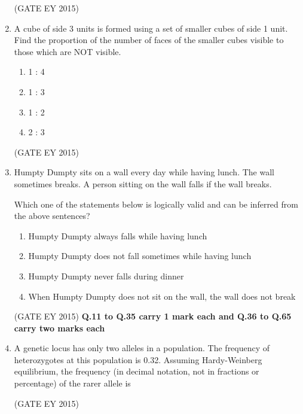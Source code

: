 \documentclass[journal,12pt,onecolumn]{IEEEtran}
\theoremstyle{remark}
\begin{document}
\begin{enumerate}
    
\hfill{(GATE EY 2015)}

\item A cube of side 3 units is formed using a set of smaller cubes of side 1 unit.
Find the proportion of the number of faces of the smaller cubes visible to those which are NOT visible.


\begin{multicols}{4}
\begin{enumerate}
    
\item 1 : 4
\item 1 : 3
\item 1 : 2
\item 2 : 3

    \end{enumerate}
    \end{multicols}
\hfill{(GATE EY 2015)}


\item Humpty Dumpty sits on a wall every day while having lunch. The wall sometimes breaks.
A person sitting on the wall falls if the wall breaks.

Which one of the statements below is logically valid and can be inferred from the above sentences?



\begin{enumerate}
    
\item Humpty Dumpty always falls while having lunch
\item Humpty Dumpty does not fall sometimes while having lunch
\item Humpty Dumpty never falls during dinner
\item When Humpty Dumpty does not sit on the wall, the wall does not break



    \end{enumerate}
    
\hfill{(GATE EY 2015)}
\textbf{Q.11 to Q.35 carry 1 mark each and Q.36 to Q.65 carry two marks each}

\item 
A genetic locus has only two alleles in a population. The frequency of heterozygotes at this population is 0.32. Assuming Hardy-Weinberg equilibrium, the frequency (in decimal notation, not in fractions or percentage) of the rarer allele is \underline{\hspace{1.5cm}}


\hfill{(GATE EY 2015)}


\end{enumerate}
\end{document}
